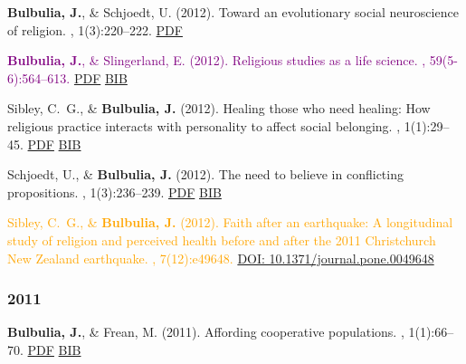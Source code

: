 \documentclass{article}
\begin{document}
\begin{thebibliography}{99}
{\bf Bulbulia, J.}, \& Schjoedt, U. (2012).
\newblock Toward an evolutionary social neuroscience of religion.
, 1(3):220--222. \href{https://www.dropbox.com/s/v59etaychbt2z25/2012.bulbulia.schoedt.towardsevoneuroscince.pdf?dl=0}{PDF}


\textcolor{Purple}{
{\bf Bulbulia, J.}, \& Slingerland, E. (2012).
\newblock Religious studies as a life science.
, 59(5-6):564--613.} \href{https://www.dropbox.com/s/eom9r3jbt1qvg4a/NU_059_05-06_564-613.pdf}{PDF} \href{https://www.dropbox.com/s/y8o9w2bvnwjimxk/2012.Bulbulia.Slingerland.Ritual.bib?dl=0}{BIB}


Sibley, C.~G., \& {\bf Bulbulia, J.} (2012).
\newblock Healing those who need healing: How religious practice interacts with
  personality to affect social belonging.
, 1(1):29--45. \href{https://www.equinoxpub.com/journals/index.php/JCSR/article/viewArticle/Healing-Those-Who-Need-Healing}{PDF} \href{https://www.dropbox.com/s/nbd18kv59i1s98a/healing.those.bib?dl=0}{BIB}


Schjoedt, U., \& {\bf Bulbulia, J.} (2012).
\newblock The need to believe in conflicting propositions.
, 1(3):236--239.
\href{http://www.tandfonline.com/doi/abs/10.1080/2153599X.2011.647857}{PDF} \href{https://www.dropbox.com/s/trju867snuho33k/needtobelieve.bib?dl=0}{BIB}


\textcolor{Orange}{Sibley, C.~G., \& {\bf Bulbulia, J.} (2012).
\newblock Faith after an earthquake: A longitudinal study of religion and
  perceived health before and after the 2011 {C}hristchurch {N}ew {Z}ealand
  earthquake.
, 7(12):e49648.\newblock 
\href{https://doi.org/10.1371/journal.pone.0049648}{DOI: 10.1371/journal.pone.0049648}}



\subsubsection*{2011} 



{\bf Bulbulia, J.}, \& Frean, M. (2011).
\newblock Affording cooperative populations.
, 1(1):66--70. \href{https://www.dropbox.com/s/2zksrbyav9agt14/BULBULIA_AFFORDING_2011.pdf?dl=0}{PDF} \href{https://www.dropbox.com/s/nkk7yepibk3f696/tandf_rrbb201_66.bib?dl=0}{BIB}



\end{thebibliography}
\end{document}
